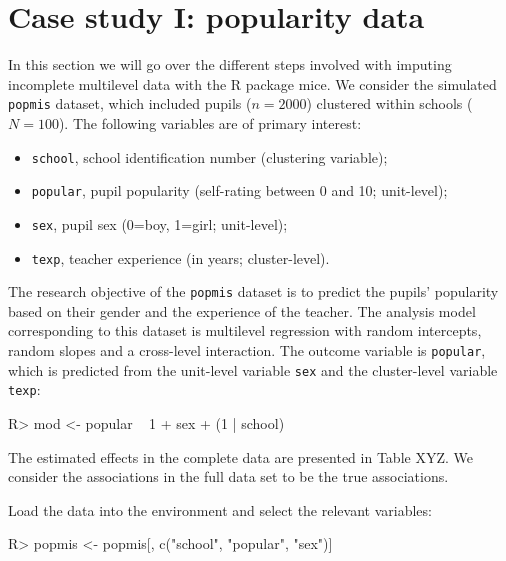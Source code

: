 \documentclass[
]{jss}
\providecommand{\tightlist}{%
  \setlength{\itemsep}{0pt}\setlength{\parskip}{0pt}}
\begin{document}
\hypertarget{case-study-i-popularity-data}{%
\section{Case study I: popularity
data}\label{case-study-i-popularity-data}}

In this section we will go over the different steps involved with
imputing incomplete multilevel data with the R package mice. We consider
the simulated \texttt{popmis} dataset, which included pupils
(\(n = 2000\)) clustered within schools (\(N = 100\)). The following
variables are of primary interest:

\begin{itemize}
\tightlist
\item
  \texttt{school}, school identification number (clustering variable);
\item
  \texttt{popular}, pupil popularity (self-rating between 0 and 10;
  unit-level);
\item
  \texttt{sex}, pupil sex (0=boy, 1=girl; unit-level);
\item
  \texttt{texp}, teacher experience (in years; cluster-level).
\end{itemize}

The research objective of the \texttt{popmis} dataset is to predict the
pupils' popularity based on their gender and the experience of the
teacher. The analysis model corresponding to this dataset is multilevel
regression with random intercepts, random slopes and a cross-level
interaction. The outcome variable is \texttt{popular}, which is
predicted from the unit-level variable \texttt{sex} and the
cluster-level variable \texttt{texp}:

\begin{CodeChunk}
\begin{CodeInput}
R> mod <- popular ~ 1 + sex + (1 | school)
\end{CodeInput}
\end{CodeChunk}

The estimated effects in the complete data are presented in Table XYZ.
We consider the associations in the full data set to be the true
associations.

Load the data into the environment and select the relevant variables:

\begin{CodeChunk}
\begin{CodeInput}
R> popmis <- popmis[, c("school", "popular", "sex")] 
\end{CodeInput}
\end{CodeChunk}
\end{document}
